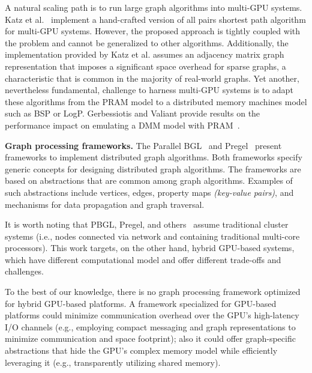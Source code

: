 A natural scaling path is to run large graph algorithms into multi-GPU systems. Katz et al.~\cite{Katz2008} implement a hand-crafted version of all pairs shortest path algorithm for multi-GPU systems. However, the proposed approach is tightly coupled with the problem and cannot be generalized to other algorithms. Additionally, the implementation provided by Katz et al. assumes an adjacency matrix graph representation that imposes a significant space overhead for sparse graphs, a characteristic that is common in the majority of real-world graphs. Yet another, nevertheless fundamental, challenge to harness multi-GPU systems is to adapt these algorithms from the PRAM model to a distributed memory machines model such as BSP or LogP. Gerbessiotis and Valiant provide results on the performance impact on emulating a DMM model with PRAM~\cite{Gerbessiotis92}. 

{\bf Graph processing frameworks.} The Parallel BGL~\cite{gregor2005parallel} and Pregel~\cite{Malewicz2009} present frameworks to implement distributed graph algorithms. Both frameworks specify generic concepts for designing distributed graph algorithms. The frameworks are based on abstractions that are common among graph algorithms. Examples of such abstractions include vertices, edges, property maps {\em (key-value pairs)}, and mechanisms for data propagation and graph traversal. 

It is worth noting that PBGL, Pregel, and others~\cite{Zhao2009} assume traditional cluster systems (i.e., nodes connected via network and containing traditional multi-core processors). This work targets, on the other hand, hybrid GPU-based systems, which have different computational model and offer different trade-offs and challenges. 

To the best of our knowledge, there is no graph processing framework optimized for hybrid GPU-based platforms. A framework specialized for GPU-based platforms could minimize communication overhead over the GPU's high-latency I/O channels (e.g., employing compact messaging and graph representations to minimize communication and space footprint); also it could offer graph-specific abstractions that hide the GPU's complex memory model while efficiently leveraging it (e.g., transparently utilizing shared memory). 
